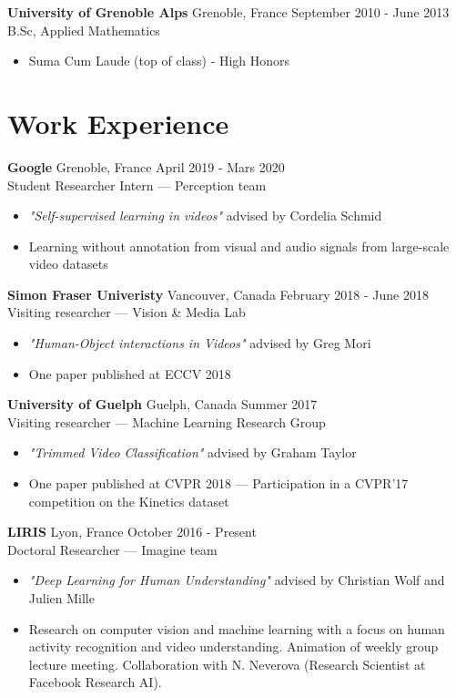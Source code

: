 \documentclass[10pt]{res} %
\begin{document}
\begin{resume}
\textbf{University of Grenoble Alps} \hfill Grenoble, France \hfill September 2010 - June 2013 \\
B.Sc, Applied Mathematics
\begin{itemize}
\item Suma Cum Laude (top of class) - High Honors
\end{itemize}
 

\section{\large Work Experience} 

\textbf{Google} \hfill Grenoble, France \hfill April 2019 - Mars 2020 \\
Student Researcher Intern --- Perception team
\begin{itemize}
\item \textit{"Self-supervised learning in videos" } advised by Cordelia Schmid
\item Learning without annotation from visual and audio signals from large-scale video datasets
\end{itemize}


\textbf{Simon Fraser Univeristy} \hfill Vancouver, Canada \hfill February 2018 - June 2018 \\
Visiting researcher --- Vision \& Media Lab
\begin{itemize}
\item \textit{"Human-Object interactions in Videos" } advised by Greg Mori
\item One paper published at ECCV 2018
\end{itemize}


\textbf{University of Guelph} \hfill Guelph, Canada \hfill Summer 2017 \\
Visiting researcher --- Machine Learning Research Group
\begin{itemize}
\item \textit{"Trimmed Video Classification"} advised by Graham Taylor
\item One paper published at CVPR 2018 --- Participation in a CVPR'17 competition on the Kinetics dataset
\end{itemize}

\textbf{LIRIS} \hfill Lyon, France \hfill October 2016 - Present \\
Doctoral Researcher --- Imagine team
\begin{itemize}
\item \textit{"Deep Learning for Human Understanding"} advised by Christian Wolf and Julien Mille
\item Research on computer vision and machine learning with a focus on human activity recognition and video understanding. Animation of weekly group lecture meeting. Collaboration with N. Neverova (Research Scientist at Facebook Research AI).
\end{itemize}


\end{resume}
\end{document}
